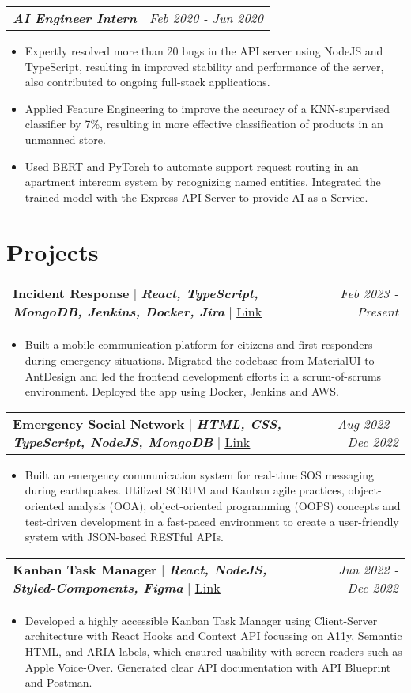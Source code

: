 \documentclass[letterpaper]{article}
\makeatletter
\newcommand{\resumeItemWithoutTitle}[1]{
  \item{
    {#1 \vspace{-2pt}}
  }
}
\newcommand{\resumeSubheadingWithoutTitle}[2]{
  \begin{tabular*}{\textwidth}{l@{\extracolsep{\fill}}r}
        \textbf{\textit{#1}} & \textit{ #2} \\
    \end{tabular*}\vspace{-14pt}
}
\newcommand{\shortSection}[1]{
    \vspace{-6pt}
    \section{#1}
}
\newcommand{\projectHeading}[4]{
  \begin{tabular*}{\textwidth}{l@{\extracolsep{\fill}}r}
        \textbf{#1} 
        \hspace{-2pt} $\vert$ \hspace{-2pt} {\textit{\textbf{#2}}} 
        \hspace{-2pt} $\vert$ \hspace{-2pt} \href{#3}{ \underline{Link}}
        & 
        \textit{#4} \\
    \end{tabular*}\vspace{-2pt}
}
\newcommand{\resumeItemListStart}{\begin{itemize}}
\newcommand{\resumeItemListEnd}{\end{itemize}}
\makeatother
\begin{document}
\vspace{2pt}
\resumeSubheadingWithoutTitle
{AI Engineer Intern}{Feb 2020 - Jun 2020}
\vspace{0pt}
\resumeItemListStart
\resumeItemWithoutTitle{Expertly resolved more than 20 bugs in the API server using NodeJS and TypeScript, resulting in improved stability and performance of the server, also contributed to ongoing full-stack applications.}
\resumeItemWithoutTitle{Applied Feature Engineering to improve the accuracy of a KNN-supervised classifier by 7\%, resulting in more effective classification of products in an unmanned store.}
\resumeItemWithoutTitle{Used BERT and PyTorch to automate support request routing in an apartment intercom system by recognizing named entities. Integrated the trained model with the Express API Server to provide AI as a Service.}
\resumeItemListEnd


\shortSection{Projects}
\vspace{3pt}
\projectHeading{Incident Response}{React, TypeScript, MongoDB, Jenkins, Docker, Jira}{https://sa.sem-ir.com/}{Feb 2023 - Present}
\resumeItemListStart
\resumeItemWithoutTitle{Built a mobile communication platform for citizens and first responders during emergency situations. Migrated the codebase from MaterialUI to AntDesign and led the frontend development efforts in a scrum-of-scrums environment. Deployed the app using Docker, Jenkins and AWS.}
\resumeItemListEnd


\vspace{3pt}
\projectHeading {Emergency Social Network}{HTML, CSS, TypeScript, NodeJS, MongoDB}{https://esn.onrender.com}{Aug 2022 - Dec 2022}
\resumeItemListStart
\resumeItemWithoutTitle{Built an emergency communication system for real-time SOS messaging during earthquakes. Utilized SCRUM and Kanban agile practices, object-oriented analysis (OOA), object-oriented programming (OOPS) concepts and test-driven development in a fast-paced environment to create a user-friendly system with JSON-based RESTful APIs.}
\resumeItemListEnd


\projectHeading {Kanban Task Manager}{React, NodeJS, Styled-Components, Figma}{https://kanbhan.netlify.app}{Jun 2022 - Dec 2022}
\resumeItemListStart
\resumeItemWithoutTitle{Developed a highly accessible Kanban Task Manager using Client-Server architecture with React Hooks and Context API focussing on A11y, Semantic HTML, and ARIA labels, which ensured usability with screen readers such as Apple Voice-Over. Generated clear API documentation with API Blueprint and Postman.}
\resumeItemListEnd
\end{document}
